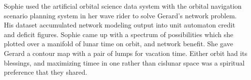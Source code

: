 

Sophie used the artificial orbital science data system with the
orbital navigation scenario planning system in her wave rider to solve
Gerard's network problem.  His dataset accumulated network modeling
output into unit automaton credit and deficit figures.  Sophie came up
with a spectrum of possibilities which she plotted over a manifold of
lunar time on orbit, and network benefit.  She gave Gerard a contour
map with a pair of lumps for vacation time.  Either orbit had its
blessings, and maximizing timee in one rather than cislunar space was
a spiritual preference that they shared.  

\bye
